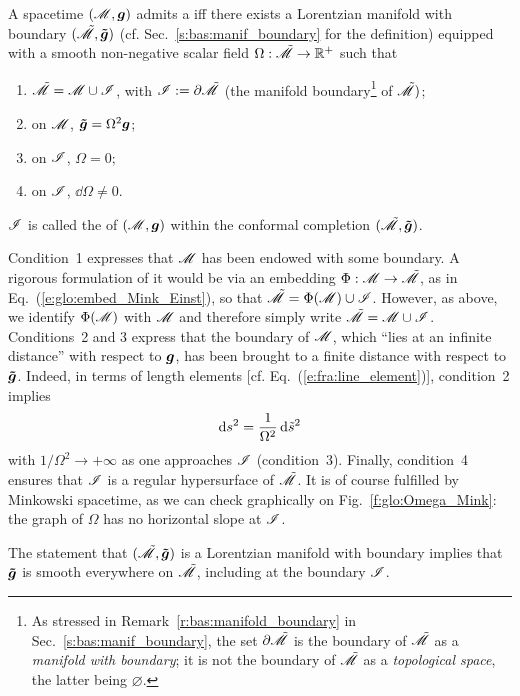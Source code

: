 \begin{greybox}
A spacetime $(\mathscr{M},\bm{g})$ admits a
iff there exists a Lorentzian manifold with boundary
$(\tilde{\mathscr{M}},\bm{\tilde{g}})$ (cf. Sec.~\ref{s:bas:manif_boundary} for the definition)
equipped with a smooth non-negative scalar field
$\Omega: \tilde{\mathscr{M}} \rightarrow \mathbb{R}^+$
such that
\begin{enumerate}
\item $\tilde{\mathscr{M}} = \mathscr{M} \cup \mathscr{I}$, with $\mathscr{I} := \partial \tilde{\mathscr{M}}$
(the manifold boundary\footnote{As stressed in Remark~\ref{r:bas:manifold_boundary}
in Sec.~\ref{s:bas:manif_boundary}, the set $\partial \tilde{\mathscr{M}}$ is
the boundary of $\tilde{\mathscr{M}}$ as a \emph{manifold with boundary}; it is not the boundary of
$\tilde{\mathscr{M}}$ as a \emph{topological space}, the latter being $\varnothing$.} of $\tilde{\mathscr{M}})$;
\item on $\mathscr{M}$, $\bm{\tilde{g}} = \Omega^2 \bm{g}$;
\item on $\mathscr{I}$, $\Omega=0$;
\item on $\mathscr{I}$, $\dd \Omega \not= 0$.
\end{enumerate}
$\mathscr{I}$ is called the 
of $(\mathscr{M},\bm{g})$ within
the conformal completion $(\tilde{\mathscr{M}},\bm{\tilde{g}})$.
\end{greybox}
Condition~1 expresses that $\mathscr{M}$ has been endowed with some boundary.
A rigorous formulation of it would be via an embedding $\Phi:\mathscr{M} \rightarrow \tilde{\mathscr{M}}$,
as in Eq.~(\ref{e:glo:embed_Mink_Einst}), so that
$\tilde{\mathscr{M}} = \Phi(\mathscr{M}) \cup \mathscr{I}$. However, as above, we identify $\Phi(\mathscr{M})$
with $\mathscr{M}$ and therefore simply write $\tilde{\mathscr{M}} = \mathscr{M} \cup \mathscr{I}$.
Conditions~2 and 3 express that the boundary of $\mathscr{M}$, which ``lies at an infinite
distance'' with respect to $\bm{g}$, has been brought to a
finite distance with respect to $\bm{\tilde{g}}$. Indeed, in terms of
length elements [cf. Eq.~(\ref{e:fra:line_element})], condition~2 implies
\[
    \mathrm{d} s^2 = \frac{1}{\Omega^2} \, \mathrm{d} {\tilde s}^2
\]
with $1/\Omega^2 \rightarrow +\infty$ as one approaches $\mathscr{I}$
(condition~3).
Finally, condition~4 ensures
that $\mathscr{I}$ is a regular hypersurface of $\tilde{\mathscr{M}}$.
It is of course fulfilled by Minkowski spacetime, as we can check graphically
on Fig.~\ref{f:glo:Omega_Mink}: the graph of $\Omega$ has no horizontal slope
at $\mathscr{I}$.

\begin{remark}
The statement that $(\tilde{\mathscr{M}},\bm{\tilde{g}})$ is a Lorentzian manifold with
boundary implies that $\bm{\tilde{g}}$ is smooth everywhere on $\tilde{\mathscr{M}}$,
including at the boundary $\mathscr{I}$.
\end{remark}

